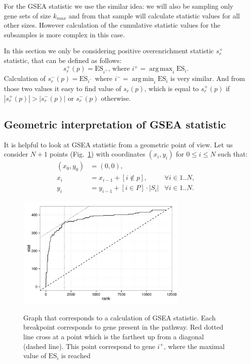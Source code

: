 \documentclass[runningheads,a4paper]{llncs}
\DeclareMathOperator*{\argmax}{arg\,max}
\DeclareMathOperator*{\argmin}{arg\,min}
\begin{document}
For the GSEA statistic we use the similar idea: we will also be sampling only 
gene sets of size $k_{max}$ and from that sample will calculate
statistic values for all other sizes. However calculation of the 
cumulative statistic values for the subsamples is more complex
in this case.

In this section we only be considering positive
overenrichment statistic 
$s^+_{r}$ statistic, that can be defined as follows:
\[
s^+_r(p) = \mathrm{ES}_{i^+} \text{, where } i^+ =  \argmax_i \mathrm{ES}_i.
\]
Calculation of $s^-_{r}(p) = \mathrm{ES}_{i^-}$ 
where $i^- =  \argmin_i\mathrm{ES}_i$
is very similar. And from those two values it easy to find 
value of $s_r(p)$, which is equal to $s^+_r(p)$ if
$|s^+_r(p)| > |s^-_r(p)|$ or $s^-_r(p)$ otherwise.


\subsection{Geometric interpretation of GSEA statistic}

It is helpful to look at GSEA statistic from a geometric point of view.
Let us consider $N+1$ points (Fig.~\ref{fig_gsea_stat}) with coordinates $(x_i, y_i)$ for $0 \le i \le N$
such that:
\begin{align}
    \label{eq_simple_0}
    (x_0, y_0) &= (0, 0), & \\ 
    \label{eq_simple_x}
    x_i &= x_{i-1} + [i \not \in p],       &\forall i \in 1..N, \\
    \label{eq_simple_y}
    y_i &= y_{i-1} + [i \in P] \cdot |S_i| &\forall i \in 1..N.
\end{align}

\begin{figure}[h]
    \centering
    { \includegraphics[width=0.75\textwidth]{gsea_stat.pdf} }
    \caption{Graph that corresponds to a calculation of GSEA 
    statistic. Each breakpoint corresponds to gene present in the pathway. 
    Red dotted line cross at a point which is the farthest
up from a diagonal (dashed line). This point correspond to gene $i^+$, 
where the maximal value of $\mathrm{ES}_i$ is reached}%
    \label{fig_gsea_stat}%
\end{figure}
\end{document}
